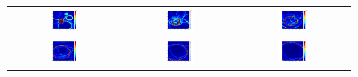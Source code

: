 \begin{figure}[H]
\begin{tabular}{ccc}
	\includegraphics[width=0.3\textwidth]{linea_timerev/figuras/timereversal/ev3/tr330.png}&
	\includegraphics[width=0.3\textwidth]{linea_timerev/figuras/timereversal/ev3/tr331.png}&
	\includegraphics[width=0.3\textwidth]{linea_timerev/figuras/timereversal/ev3/tr332.png}\\
	\includegraphics[width=0.3\textwidth]{linea_timerev/figuras/timereversal/ev3/tr333.png}&
	\includegraphics[width=0.3\textwidth]{linea_timerev/figuras/timereversal/ev3/tr334.png}&
	\includegraphics[width=0.3\textwidth]{linea_timerev/figuras/timereversal/ev3/tr335.png}\\

\end{tabular}
\end{figure}
